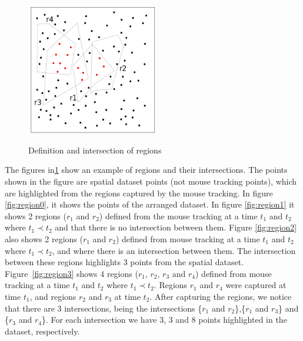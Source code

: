 \documentclass[runningheads,a4paper]{llncs}
\begin{document}
\begin{figure}[!ht]
{    \includegraphics[width=5.8cm]{imgs/region3.png}
     \label{fig:region3} 
  } %
 

  \caption{Definition and intersection of regions}
  \label{fig:regions}
\end{figure} %

The figures in\ref{fig:regions} show an example of regions and their intersections. The points shown in the figure are spatial dataset points (not mouse tracking points), which are highlighted from the regions captured by the mouse tracking. In figure \ref{fig:region0}, it shows the points of the arranged dataset. In figure \ref{fig:region1} it shows 2 regions ($r_1$ and $r_2$) defined from the mouse tracking at a time $t_1$ and $t_2$ where $t_1 \prec t_2$ and that there is no intersection between them. Figure \ref{fig:region2} also shows 2 regions ($r_1$ and $r_2$) defined from mouse tracking at a time $t_1$ and $t_2$ where $t_1 \prec t_2$, and where there is an intersection between them. The intersection between these regions highlights 3 points from the spatial dataset. Figure~\ref{fig:region3} shows 4 regions ($r_1$, $r_2$, $r_3$ and $r_4$) defined from mouse tracking at a time $t_1$ and $t_2$ where $t_1 \prec t_2 $. Regions $r_1$ and $r_4$ were captured at time $t_1$, and regions $r_2$ and $r_3$ at time $t_2$. After capturing the regions, we notice that there are 3 intersections, being the intersections \{$r_1$ and $r_2$\},\{$r_1$ and $r_3$\} and \{$r_3$ and $r_4$\}. For each intersection we have 3, 3 and 8 points highlighted in the dataset, respectively.
\end{document}
